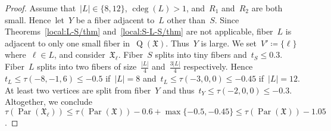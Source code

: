 \documentclass[english,a4paper]{article}
\theoremstyle{plain}
\theoremstyle{definition}
\newcommand{\abs}[1]{| #1 |}
\newcommand{\coherentConfig}{\ensuremath{\mathfrak{X}}}
\DeclareMathOperator*{\Quotient}{Q}
\newcommand{\quotientGraph}[1]{\ensuremath{\Quotient(#1)}}
\DeclareMathOperator{\ColorDeg}{cdeg}
\newcommand{\colorDeg}[1]{\ensuremath{\ColorDeg\left(#1\right)}}
\DeclareMathOperator{\parameters}{Par}
\begin{document}
\begin{proof}
    Assume that~$\abs{L} \in \{8,12\}$, $\colorDeg{L} > 1$, and~$R_1$ and~$R_2$ are both small.
    Hence~let~$Y$ be a fiber adjacent to~$L$ other than~$S$.
    Since Theorems~\ref{local:L-S/thm} and~\ref{local:S-L-S/thm} are not applicable, fiber~$L$ is adjacent to only one small fiber in~$\quotientGraph{\coherentConfig}$.
    Thus~$Y$ is large.
    We set~$V' \coloneqq \{\ell\}$ where~$\ell \in L$, and consider~$\coherentConfig_{\ell}$.
    Fiber~$S$ splits into tiny fibers and~$t_S \leq 0.3$.
    Fiber~$L$ splits into two fibers of size~$\frac{|L|}{4}$ and~$\frac{3|L|}{4}$ respectively.
    Hence~$t_L \leq \tau(-8,-1,6) \leq -0.5$ if~$|L| = 8$ and~$t_L \leq \tau(-3,0,0) \leq -0.45$ if~$|L| = 12$.
    At least two vertices are split from fiber~$Y$ and thus~$t_Y \leq \tau(-2,0,0) \leq -0.3$.
    Altogether, we conclude~ $\tau(\parameters(\coherentConfig_{\ell})) \leq \tau(\parameters(\coherentConfig)) - 0.6 + \max\{-0.5,-0.45\} \leq \tau(\parameters(\coherentConfig)) -1.05$.
\end{proof}
\end{document}
